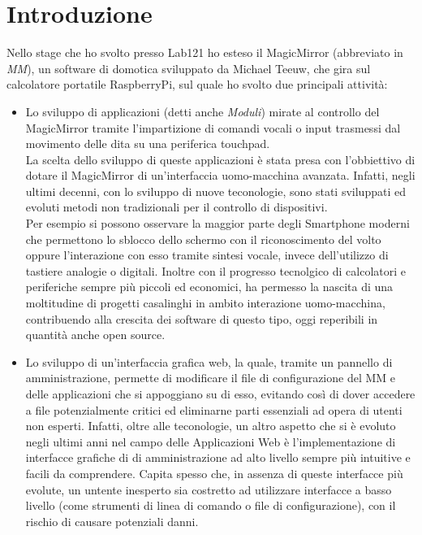 \chapter*{Introduzione}

Nello stage che ho svolto presso Lab121 ho esteso il MagicMirror (abbreviato in \emph{MM}), un software di domotica sviluppato da Michael Teeuw,
che gira sul calcolatore portatile RaspberryPi\cite{Raspberry}, sul quale ho svolto due principali attivit\`a:\\
\begin{itemize}
\item Lo sviluppo di applicazioni (detti anche \emph{Moduli}) mirate al controllo del
MagicMirror tramite l'impartizione di comandi vocali o input trasmessi dal movimento delle dita su
una periferica touchpad.\\
La scelta dello sviluppo di queste applicazioni \`e stata presa con l'obbiettivo di dotare il
MagicMirror di un'interfaccia uomo-macchina avanzata. Infatti, negli ultimi decenni, con lo sviluppo
di nuove teconologie, sono stati sviluppati ed evoluti metodi non tradizionali per il controllo di dispositivi.\\
Per esempio si possono osservare la maggior parte degli Smartphone moderni che permettono lo sblocco dello schermo con
il riconoscimento del volto oppure l'interazione con esso tramite sintesi vocale,
invece dell'utilizzo di tastiere analogie o digitali.
Inoltre con il progresso tecnolgico di calcolatori e periferiche sempre pi\`u piccoli ed economici, ha permesso
la nascita di una moltitudine di progetti casalinghi in ambito interazione uomo-macchina, contribuendo
alla crescita dei software di questo tipo, oggi reperibili in quantit\`a anche open source.\\[1\baselineskip]
\item Lo sviluppo di un'interfaccia grafica web, la quale, tramite un pannello di amministrazione,
 permette di modificare il file di configurazione del MM e delle applicazioni che si appoggiano su di esso,
evitando cos\`i di dover accedere
a file potenzialmente critici ed eliminarne parti essenziali ad opera di utenti non esperti.
Infatti, oltre alle teconologie, un altro aspetto che si \`e evoluto negli ultimi anni
nel campo delle Applicazioni Web \`e l'implementazione di interfacce grafiche di di amministrazione
ad alto livello sempre pi\`u intuitive e facili da comprendere.
Capita spesso che, in assenza di queste interfacce pi\`u evolute, un untente inesperto sia
costretto ad utilizzare interfacce a basso livello (come strumenti di linea di comando o file
di configurazione), con il rischio di causare potenziali danni.\\[2\baselineskip]
\end{itemize}

